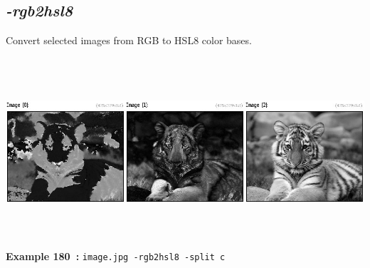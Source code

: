 \documentclass[a4paper,11pt,twoside]{book}
\begin{document}
\subsection{\emph{-rgb2hsl8} }\vspace*{-0.5em}
Convert selected images from RGB to HSL8 color bases.
\begin{center}\includegraphics[keepaspectratio=true,height=7cm,width=\textwidth]{img/gmic_def180.jpg}\\
{\footnotesize \textbf{Example 180~:} \texttt{image.jpg -rgb2hsl8 -split c}}
\end{center}
\end{document}
